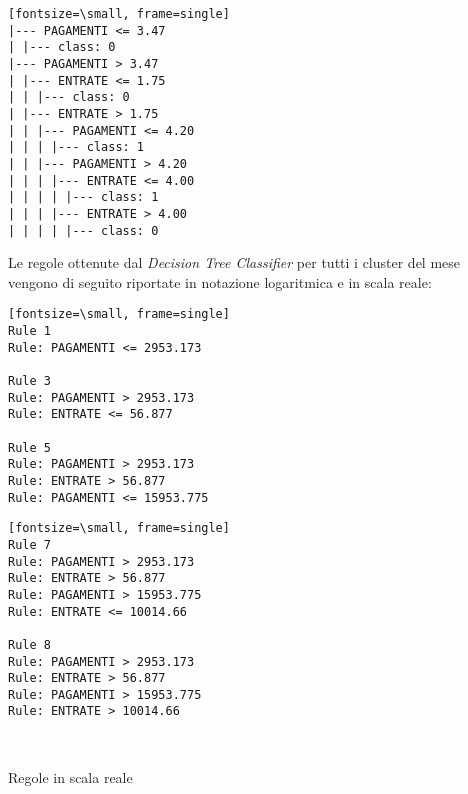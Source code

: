 \begin{center}
\begin{minipage}{6cm}
\begin{Verbatim}[t][fontsize=\small, frame=single]
|--- PAGAMENTI <= 3.47
| |--- class: 0
|--- PAGAMENTI > 3.47
| |--- ENTRATE <= 1.75
| | |--- class: 0
| |--- ENTRATE > 1.75
| | |--- PAGAMENTI <= 4.20
| | | |--- class: 1
| | |--- PAGAMENTI > 4.20
| | | |--- ENTRATE <= 4.00
| | | | |--- class: 1
| | | |--- ENTRATE > 4.00
| | | | |--- class: 0
\end{Verbatim}
\end{minipage}
\end{center}
\newpage

\noindent Le regole ottenute dal \textit{Decision Tree Classifier} per tutti i cluster del mese vengono di seguito riportate in notazione logaritmica e  in scala reale: \\
\vspace{1cm}

\begin{minipage}{7cm}
\raggedright
\begin{Verbatim}[t][fontsize=\small, frame=single]
Rule 1
Rule: PAGAMENTI <= 2953.173

Rule 3
Rule: PAGAMENTI > 2953.173
Rule: ENTRATE <= 56.877

Rule 5
Rule: PAGAMENTI > 2953.173
Rule: ENTRATE > 56.877
Rule: PAGAMENTI <= 15953.775
\end{Verbatim}
\end{minipage}%
\begin{minipage}{6cm}
\raggedleft
\begin{Verbatim}[t][fontsize=\small, frame=single]
Rule 7
Rule: PAGAMENTI > 2953.173
Rule: ENTRATE > 56.877
Rule: PAGAMENTI > 15953.775
Rule: ENTRATE <= 10014.66

Rule 8
Rule: PAGAMENTI > 2953.173
Rule: ENTRATE > 56.877
Rule: PAGAMENTI > 15953.775
Rule: ENTRATE > 10014.66 
\end{Verbatim}
\end{minipage}%
 \\
\begin{center}
    Regole in scala reale
\end{center}

\vspace{1.3cm}
 
